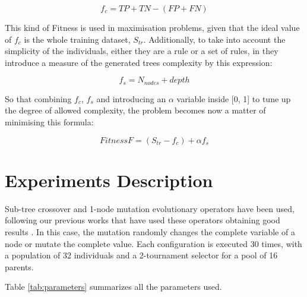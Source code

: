 \documentclass[a4paper,10pt,twocolumn,preprint,3p]{elsarticle}
\begin{document}

\begin{equation}
\label{eq:coverage}
f_{c} = TP + TN - (FP + FN)
\end{equation}

This kind of Fitness is used in maximisation problems, given that the ideal value of $f_{c}$ is the whole training dataset, $S_{tr}$. Additionally, to take into account the simplicity of the individuals, either they are a rule or a set of rules, in \cite{witten2005data} they introduce a measure of the generated trees complexity by this expression:

\begin{equation}
f_{s} = N_{nodes} + depth
\end{equation}

So that combining $f_{c}$, $f_{s}$ and introducing an $\alpha$ variable inside [0, 1] to tune up the degree of allowed complexity, the problem becomes now a matter of minimising this formula:

\begin{equation}
\label{eq:complexFitness}
Fitness F = (S_{tr} - f_{c}) + \alpha f_{s}
\end{equation}

\section{Experiments Description}
\label{sec:experiments}

Sub-tree crossover and 1-node mutation evolutionary operators have
been used, following our previous works that have used these operators
obtaining good results \cite{EvoStar2014:GPBot}. In this case, the
mutation randomly changes the complete variable of a node or mutate
the complete value. Each configuration is executed 30 times, with a
population of 32 individuals and a 2-tournament selector for a pool of
16 parents.


Table \ref{tab:parameters} summarizes all the parameters used.
\end{document}
